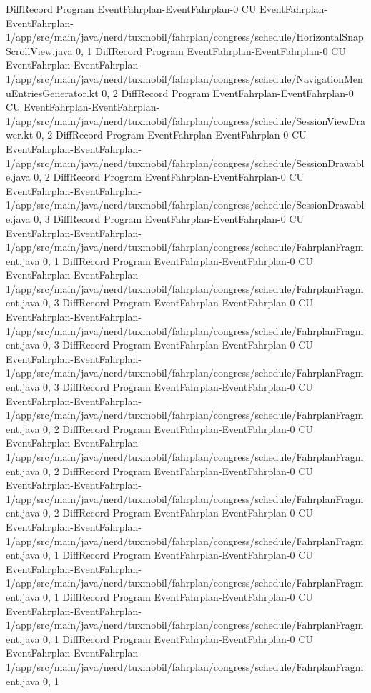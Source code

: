 DiffRecord Program EventFahrplan-EventFahrplan-0 CU EventFahrplan-EventFahrplan-1/app/src/main/java/nerd/tuxmobil/fahrplan/congress/schedule/HorizontalSnapScrollView.java  {0, 1}
DiffRecord Program EventFahrplan-EventFahrplan-0 CU EventFahrplan-EventFahrplan-1/app/src/main/java/nerd/tuxmobil/fahrplan/congress/schedule/NavigationMenuEntriesGenerator.kt  {0, 2}
DiffRecord Program EventFahrplan-EventFahrplan-0 CU EventFahrplan-EventFahrplan-1/app/src/main/java/nerd/tuxmobil/fahrplan/congress/schedule/SessionViewDrawer.kt  {0, 2}
DiffRecord Program EventFahrplan-EventFahrplan-0 CU EventFahrplan-EventFahrplan-1/app/src/main/java/nerd/tuxmobil/fahrplan/congress/schedule/SessionDrawable.java  {0, 2}
DiffRecord Program EventFahrplan-EventFahrplan-0 CU EventFahrplan-EventFahrplan-1/app/src/main/java/nerd/tuxmobil/fahrplan/congress/schedule/SessionDrawable.java  {0, 3}
DiffRecord Program EventFahrplan-EventFahrplan-0 CU EventFahrplan-EventFahrplan-1/app/src/main/java/nerd/tuxmobil/fahrplan/congress/schedule/FahrplanFragment.java  {0, 1}
DiffRecord Program EventFahrplan-EventFahrplan-0 CU EventFahrplan-EventFahrplan-1/app/src/main/java/nerd/tuxmobil/fahrplan/congress/schedule/FahrplanFragment.java  {0, 3}
DiffRecord Program EventFahrplan-EventFahrplan-0 CU EventFahrplan-EventFahrplan-1/app/src/main/java/nerd/tuxmobil/fahrplan/congress/schedule/FahrplanFragment.java  {0, 3}
DiffRecord Program EventFahrplan-EventFahrplan-0 CU EventFahrplan-EventFahrplan-1/app/src/main/java/nerd/tuxmobil/fahrplan/congress/schedule/FahrplanFragment.java  {0, 3}
DiffRecord Program EventFahrplan-EventFahrplan-0 CU EventFahrplan-EventFahrplan-1/app/src/main/java/nerd/tuxmobil/fahrplan/congress/schedule/FahrplanFragment.java  {0, 2}
DiffRecord Program EventFahrplan-EventFahrplan-0 CU EventFahrplan-EventFahrplan-1/app/src/main/java/nerd/tuxmobil/fahrplan/congress/schedule/FahrplanFragment.java  {0, 2}
DiffRecord Program EventFahrplan-EventFahrplan-0 CU EventFahrplan-EventFahrplan-1/app/src/main/java/nerd/tuxmobil/fahrplan/congress/schedule/FahrplanFragment.java  {0, 2}
DiffRecord Program EventFahrplan-EventFahrplan-0 CU EventFahrplan-EventFahrplan-1/app/src/main/java/nerd/tuxmobil/fahrplan/congress/schedule/FahrplanFragment.java  {0, 1}
DiffRecord Program EventFahrplan-EventFahrplan-0 CU EventFahrplan-EventFahrplan-1/app/src/main/java/nerd/tuxmobil/fahrplan/congress/schedule/FahrplanFragment.java  {0, 1}
DiffRecord Program EventFahrplan-EventFahrplan-0 CU EventFahrplan-EventFahrplan-1/app/src/main/java/nerd/tuxmobil/fahrplan/congress/schedule/FahrplanFragment.java  {0, 1}
DiffRecord Program EventFahrplan-EventFahrplan-0 CU EventFahrplan-EventFahrplan-1/app/src/main/java/nerd/tuxmobil/fahrplan/congress/schedule/FahrplanFragment.java  {0, 1}
